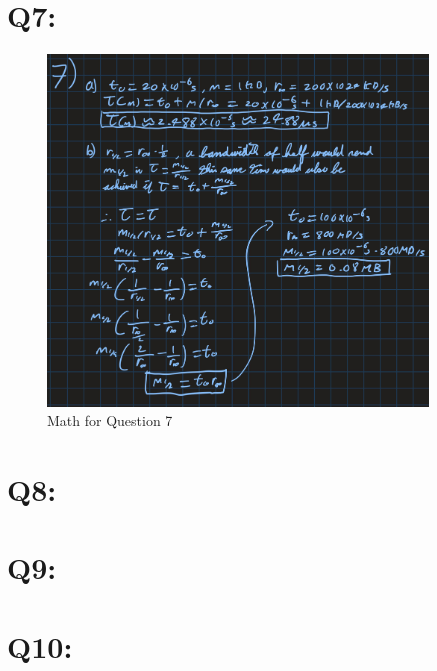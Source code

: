 \documentclass[11pt]{article}
\begin{document}
\newpage


\section*{Q7:}

\begin{figure}[H]
\centering
    \includegraphics[width=0.9\textwidth]{./images/q7.jpg}
\caption{Math for Question 7}
\label{fig:q7}
\end{figure}

\newpage

\section*{Q8:}
\newpage

\section*{Q9:}

\newpage

\section*{Q10:}

\newpage

\begin{appendices}\label{Appendix}
\end{appendices}
\end{document}

